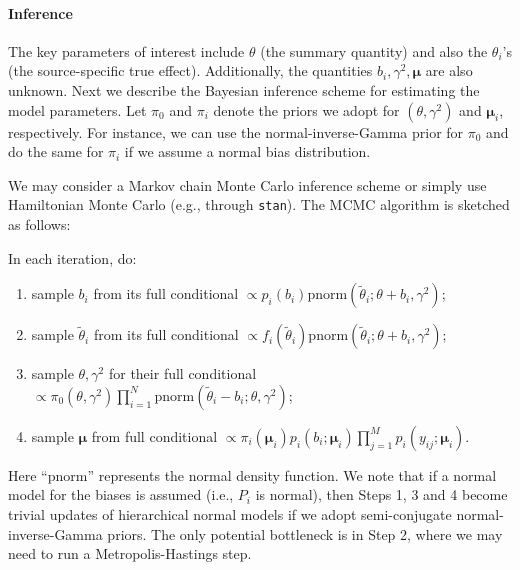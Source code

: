 \documentclass{article}
\begin{document}

\paragraph{Inference} 
The key parameters of interest include $\theta$ (the summary quantity) and also the $\theta_i$'s (the source-specific true effect). 
Additionally, the quantities $b_i, \gamma^2, \boldsymbol\mu$ are also unknown.
Next we describe the Bayesian inference scheme for estimating the model parameters.
Let $\pi_0$ and $\pi_i$ denote the priors we adopt for $(\theta,\gamma^2)$ and $\boldsymbol\mu_i$, respectively. 
For instance, we can use the normal-inverse-Gamma prior for $\pi_0$ and do the same for $\pi_i$ if we assume a normal bias distribution. 


We may consider a Markov chain Monte Carlo inference scheme or simply use Hamiltonian Monte Carlo (e.g., through \texttt{stan}). The MCMC algorithm is sketched as follows:

In each iteration, do:
\begin{enumerate}
    \item sample $b_i$ from its full conditional $\propto p_i(b_i)\text{pnorm}(\tilde\theta_i; \theta+b_i, \gamma^2)$;
    \item sample $\tilde\theta_i$ from its full conditional $\propto f_i(\tilde\theta_i)\text{pnorm}(\tilde\theta_i; \theta+b_i, \gamma^2)$;
    \item sample $\theta, \gamma^2$ for their full conditional $\propto \pi_0(\theta, \gamma^2) \prod_{i=1}^N \text{pnorm}(\tilde\theta_i-b_i; \theta, \gamma^2)$;
    \item sample $\boldsymbol\mu$ from full conditional $\propto \pi_i(\boldsymbol\mu_i) p_i(b_i; \boldsymbol\mu_i) \prod_{j=1}^M p_i(y_{ij}; \boldsymbol\mu_i)$.
\end{enumerate}
Here ``$\text{pnorm}$'' represents the normal density function. 
We note that if a normal model for the biases is assumed (i.e., $P_i$ is normal), 
then Steps 1, 3 and 4 become trivial updates of hierarchical normal models if we adopt semi-conjugate normal-inverse-Gamma priors. 
The only potential bottleneck is in Step 2, where we may need to run a Metropolis-Hastings step. 
\end{document}

